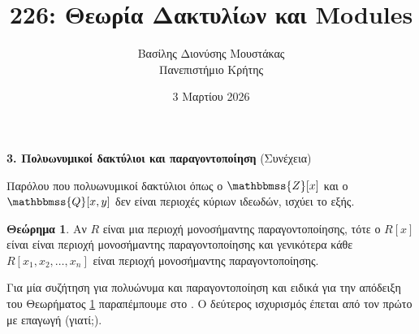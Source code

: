 \documentclass[12pt,a4paper,reqno]{amsart}
\title{226: Θεωρία Δακτυλίων και Modules}
\author[Β.~Δ. Μουστακας]{Βασίλης Διονύσης Μουστάκας \\ Πανεπιστήμιο Κρήτης}
\date{3 Μαρτίου 2026}
\theoremstyle{definition}
\newtheorem{theorem}{Θεώρημα}
\theoremstyle{remark}
\numberwithin{theorem}{section}
\numberwithin{exercise}{section}
\numberwithin{equation}{section}
\newcommand{\ZZ}{\mathbbmss{Z}}
\newcommand{\QQ}{\mathbbmss{Q}}
\begin{document}
\begingroup
\def\uppercasenonmath#1{} %
\let\MakeUppercase\relax %
\maketitle
\endgroup

\setcounter{section}{3}
\setcounter{theorem}{5}
\begin{center}
    \textbf{3. Πολυωνυμικοί δακτύλιοι και παραγοντοποίηση
} (Συνέχεια)
\end{center}

Παρόλου που πολυωνυμικοί δακτύλιοι όπως ο $\ZZ[x]$ και ο $\QQ[x,y]$ δεν είναι περιοχές κύριων ιδεωδών, ισχύει το εξής.
\begin{theorem}
    \label{thm:polynomial_rings_UFD}
    Αν $R$ είναι μια περιοχή μονοσήμαντης παραγοντοποίησης, τότε ο $R[x]$ είναι είναι περιοχή μονοσήμαντης παραγοντοποίησης και γενικότερα κάθε $R[x_1, x_2, \dots, x_n]$ είναι περιοχή μονοσήμαντης παραγοντοποίησης.
\end{theorem}

Για μία συζήτηση για πολυώνυμα και παραγοντοποίηση και ειδικά για την απόδειξη του Θεωρήματος \ref{thm:polynomial_rings_UFD} παραπέμπουμε στο \cite[Ενότητα~3.4]{VDEMT13}. Ο δεύτερος ισχυρισμός έπεται από τον πρώτο με επαγωγή (γιατί;). 
\end{document}
